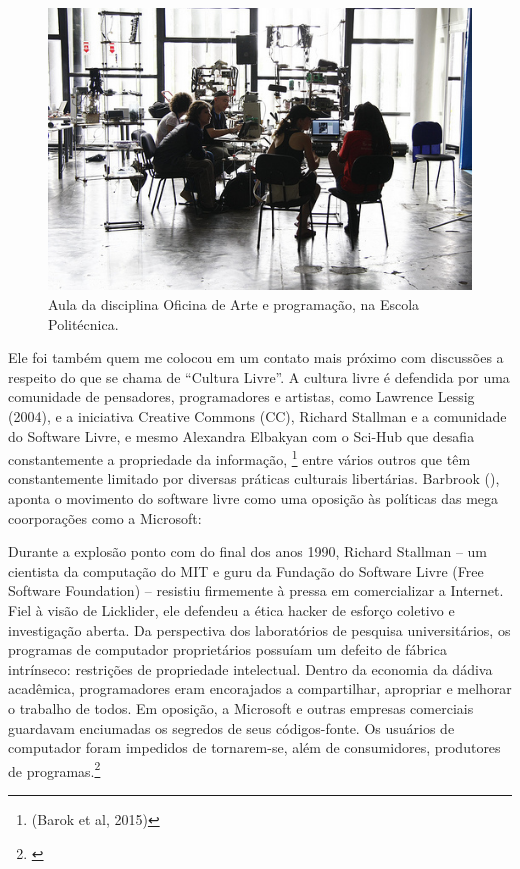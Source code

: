 \begin{figure}

\includegraphics[width=1\textwidth]{pictures/cap1/eti2}
\caption{Aula da disciplina Oficina de Arte e programação, na Escola Politécnica.}
\label{fig:eti2}
\end{figure}

Ele foi também quem me colocou em um contato mais próximo com discussões a respeito do que se chama de ``Cultura Livre''. A cultura livre é defendida por uma comunidade de pensadores, programadores e artistas, como Lawrence Lessig (2004), e a iniciativa Creative Commons (CC), Richard Stallman e a comunidade do Software Livre, e mesmo Alexandra Elbakyan com o Sci-Hub que desafia constantemente a propriedade da informação, \footnote{(Barok et al, 2015)} entre vários outros que têm constantemente limitado por diversas práticas culturais libertárias. Barbrook (\citeyear{Barbrook2009}), aponta o movimento do software livre como uma oposição às políticas das mega coorporações como a Microsoft:

\begin{citacao}
Durante a explosão ponto com do final dos anos 1990, Richard Stallman – um cientista da computação do MIT e guru da Fundação do Software Livre (Free Software Foundation) – resistiu firmemente à pressa em comercializar a Internet. Fiel à visão de Licklider, ele defendeu a ética hacker de esforço coletivo e investigação aberta. Da perspectiva dos laboratórios de pesquisa universitários, os programas de computador proprietários possuíam um defeito de fábrica intrínseco: restrições de propriedade intelectual. Dentro da economia da dádiva acadêmica, programadores eram encorajados a compartilhar, apropriar e melhorar o trabalho de todos. Em oposição, a Microsoft e outras empresas comerciais guardavam enciumadas os segredos de seus códigos-fonte. Os usuários de computador foram impedidos de tornarem-se, além de consumidores, produtores de programas.\footnote{\cite[367]{Barbrook2009}}
\end{citacao}

